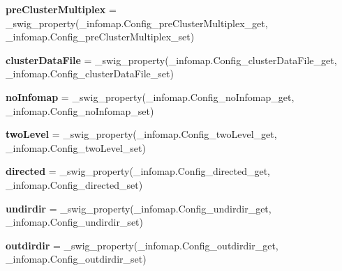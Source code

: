 \begin{DoxyCompactItemize}
{\bfseries pre\+Cluster\+Multiplex} = \+\_\+swig\+\_\+property(\+\_\+infomap.\+Config\+\_\+pre\+Cluster\+Multiplex\+\_\+get, \+\_\+infomap.\+Config\+\_\+pre\+Cluster\+Multiplex\+\_\+set)
\item 
\mbox{\label{classdsmacc_1_1graph_1_1infomap_1_1Config_a1799f9895ecf7d4eec0fbf7e3213c6bf}} 
{\bfseries cluster\+Data\+File} = \+\_\+swig\+\_\+property(\+\_\+infomap.\+Config\+\_\+cluster\+Data\+File\+\_\+get, \+\_\+infomap.\+Config\+\_\+cluster\+Data\+File\+\_\+set)
\item 
\mbox{\label{classdsmacc_1_1graph_1_1infomap_1_1Config_ac4d43c3ae0257f7b70f1e2c1901a86d7}} 
{\bfseries no\+Infomap} = \+\_\+swig\+\_\+property(\+\_\+infomap.\+Config\+\_\+no\+Infomap\+\_\+get, \+\_\+infomap.\+Config\+\_\+no\+Infomap\+\_\+set)
\item 
\mbox{\label{classdsmacc_1_1graph_1_1infomap_1_1Config_a27da85531f73b93033af297d9d1ad56c}} 
{\bfseries two\+Level} = \+\_\+swig\+\_\+property(\+\_\+infomap.\+Config\+\_\+two\+Level\+\_\+get, \+\_\+infomap.\+Config\+\_\+two\+Level\+\_\+set)
\item 
\mbox{\label{classdsmacc_1_1graph_1_1infomap_1_1Config_aef737dfb0898891e1d5fdbb6a702ee85}} 
{\bfseries directed} = \+\_\+swig\+\_\+property(\+\_\+infomap.\+Config\+\_\+directed\+\_\+get, \+\_\+infomap.\+Config\+\_\+directed\+\_\+set)
\item 
\mbox{\label{classdsmacc_1_1graph_1_1infomap_1_1Config_a706139a786fb1abae9ad0204073d94d6}} 
{\bfseries undirdir} = \+\_\+swig\+\_\+property(\+\_\+infomap.\+Config\+\_\+undirdir\+\_\+get, \+\_\+infomap.\+Config\+\_\+undirdir\+\_\+set)
\item 
\mbox{\label{classdsmacc_1_1graph_1_1infomap_1_1Config_aeae63eabc9fea787930f8db0b2aeedb6}} 
{\bfseries outdirdir} = \+\_\+swig\+\_\+property(\+\_\+infomap.\+Config\+\_\+outdirdir\+\_\+get, \+\_\+infomap.\+Config\+\_\+outdirdir\+\_\+set)
\item 
\mbox{\label{classdsmacc_1_1graph_1_1infomap_1_1Config_a93b6ad362ff370643d50f64a0a67563d}} 

\end{DoxyCompactItemize}
